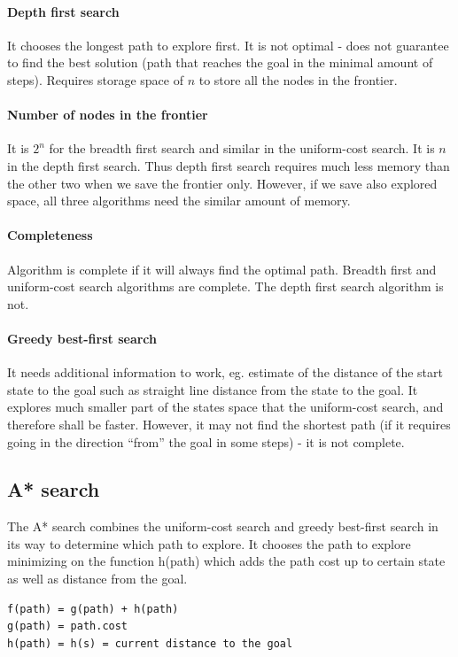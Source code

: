 \documentclass[a4paper,10pt]{article}
\begin{document}
\paragraph{Depth first search}
It chooses the longest path to explore first. It is not optimal - does not guarantee to find the best solution (path that reaches the goal in the minimal amount of steps). Requires storage space of $n$ to store all the nodes in the frontier.

\paragraph{Number of nodes in the frontier}
It is $2^n$ for the breadth first search and similar in the uniform-cost search. It is $n$ in the depth first search. Thus depth first search requires much less memory than the other two when we save the frontier only. However, if we save also explored space, all three algorithms need the similar amount of memory.

\paragraph{Completeness}
Algorithm is complete if it will always find the optimal path. Breadth first and uniform-cost search algorithms are complete. The depth first search algorithm is not.

\paragraph{Greedy best-first search}
It needs additional information to work, eg. estimate of the distance of the start state to the goal such as straight line distance from the state to the goal. It explores much smaller part of the states space that the uniform-cost search, and therefore shall be faster. However, it may not find the shortest path (if it requires going in the direction ``from'' the goal in some steps) - it is not complete.

\subsection{A* search}
The A* search combines the uniform-cost search and greedy best-first search in its way to determine which path to explore. It chooses the path to explore minimizing on the function h(path) which adds the path cost up to certain state as well as distance from the goal.
\begin{verbatim}
f(path) = g(path) + h(path)
g(path) = path.cost
h(path) = h(s) = current distance to the goal
\end{verbatim}
\end{document}
